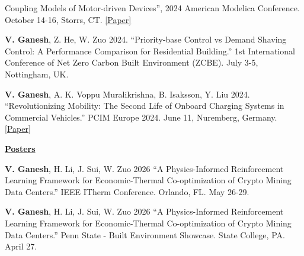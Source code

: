 \documentclass[]{Keval-resume}
\begin{document}
{{\begin{etaremune}
Coupling Models of Motor-driven Devices”, 2024 American Modelica Conference. October 14-16, Storrs,
CT. \href{https://doi.org/10.3384/ecp207136}{[Paper]}
\item \textbf{V. Ganesh}, Z. He, W. Zuo 2024. “Priority-base Control vs Demand Shaving Control: A Performance
Comparison for Residential Building.” 1st International Conference of Net Zero Carbon Built Environment
(ZCBE). July 3-5, Nottingham, UK.
\item \textbf{V. Ganesh}, A. K. Voppu Muralikrishna, B. Isaksson, Y. Liu 2024. “Revolutionizing Mobility: The Second Life of Onboard Charging
Systems in Commercial Vehicles.” PCIM Europe 2024. June 11, Nuremberg, Germany. \href{https://ieeexplore.ieee.org/abstract/document/10653984}{[Paper]}
\end{etaremune}

\textbf{\underline{Posters}}

\begin{etaremune}
\setlength{\itemsep}{0pt}
    \setlength{\parsep}{0pt}
    \item \textbf{V. Ganesh}, H. Li, J. Sui, W. Zuo 2026 “A Physics-Informed Reinforcement Learning Framework for Economic-Thermal Co-optimization of Crypto Mining Data Centers.” IEEE ITherm Conference. Orlando, FL. May 26-29.
    \item \textbf{V. Ganesh}, H. Li, J. Sui, W. Zuo 2026 “A Physics-Informed Reinforcement Learning Framework for Economic-Thermal Co-optimization of Crypto Mining Data Centers.” Penn State - Built Environment Showcase. State College, PA. April 27.
\end{etaremune}




}}
\end{document}
